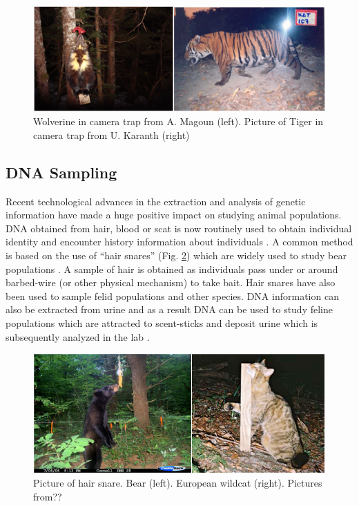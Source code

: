 \begin{figure}
\begin{center}
\includegraphics[width=5in]{Ch1/figs/wolverinetiger}
\end{center}
\caption{Wolverine in camera trap from A. Magoun (left). Picture of Tiger in
  camera trap from U. Karanth (right)}
\label{fig.wolverinetiger}
\end{figure}

\subsection{DNA Sampling}

Recent technological advances in the extraction and analysis of
genetic information have made a huge positive impact on studying
animal populations. DNA obtained from hair, blood or scat is now
routinely used to obtain individual identity and encounter history
information about individuals \citep{taberlet_bouvent:1992,
  woods_etal:1999, mills_etal:2000, schwartz_monfort:2008}.  A common
method is based on the use of ``hair snares'' (Fig. \ref{fig.bearcat})
which are widely used to study bear populations
\citep{woods_etal:1999, gardner_etal:2010, garshelis_etal:2006,
  kendall_etal:2009}.  A sample of hair is obtained as individuals
pass under or around barbed-wire (or other physical mechanism) to take
bait. Hair snares have also been used to sample felid populations
\citep{garciaalaniz_etal:2010} and other species. DNA information can
also be extracted from urine and as a result DNA can be used to study
feline populations which are attracted to scent-sticks and deposit
urine which is subsequently analyzed in the lab
\citep{valiere_taberlet:2000, kery_etal:2010}.


\begin{figure}
\begin{center}
\includegraphics[width=5in]{Ch1/figs/bearcat}
\end{center}
\caption{Picture of hair snare. Bear (left). European wildcat
  (right). Pictures from??}
\label{fig.bearcat}
\end{figure}

